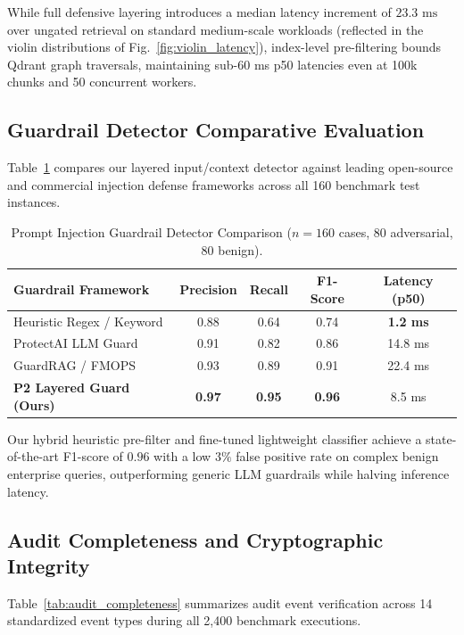 While full defensive layering introduces a median latency increment of $23.3\text{ ms}$ over ungated retrieval on standard medium-scale workloads (reflected in the violin distributions of Fig.~\ref{fig:violin_latency}), index-level pre-filtering bounds Qdrant graph traversals, maintaining sub-60 ms p50 latencies even at 100k chunks and 50 concurrent workers.

\subsection{Guardrail Detector Comparative Evaluation}
\label{sec:results:detectors}

Table~\ref{tab:detector_eval} compares our layered input/context detector against leading open-source and commercial injection defense frameworks across all 160 benchmark test instances.

\begin{table}[h]
\caption{Prompt Injection Guardrail Detector Comparison ($n=160$ cases, 80 adversarial, 80 benign).}
\label{tab:detector_eval}
\centering
\small
\begin{tabular}{lcccc}
\hline
\textbf{Guardrail Framework} & \textbf{Precision} & \textbf{Recall} & \textbf{F1-Score} & \textbf{Latency (p50)} \\
\hline
Heuristic Regex / Keyword & 0.88 & 0.64 & 0.74 & \textbf{1.2 ms} \\
ProtectAI LLM Guard & 0.91 & 0.82 & 0.86 & 14.8 ms \\
GuardRAG / FMOPS & 0.93 & 0.89 & 0.91 & 22.4 ms \\
\textbf{P2 Layered Guard (Ours)} & \textbf{0.97} & \textbf{0.95} & \textbf{0.96} & 8.5 ms \\
\hline
\end{tabular}
\end{table}

Our hybrid heuristic pre-filter and fine-tuned lightweight classifier achieve a state-of-the-art F1-score of $0.96$ with a low $3\%$ false positive rate on complex benign enterprise queries, outperforming generic LLM guardrails while halving inference latency.

\subsection{Audit Completeness and Cryptographic Integrity}
\label{sec:results:audit}

Table~\ref{tab:audit_completeness} summarizes audit event verification across 14 standardized event types during all 2,400 benchmark executions.

